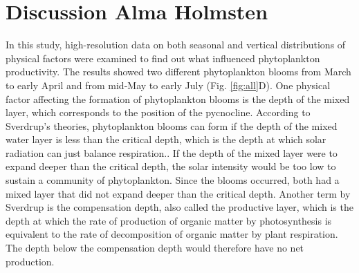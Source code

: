 \documentclass[../Main.tex]{subfiles}
\begin{document}
\section*{\crule[blue]{.3cm}{.3cm} Discussion \scriptsize{Alma Holmsten}}
In this study, high-resolution data on both seasonal and vertical distributions of physical factors were examined to find out what influenced phytoplankton productivity. The results showed two different phytoplankton blooms from March to early April and from mid-May to early July (Fig. \ref{fig:all}D). One physical factor affecting the formation of phytoplankton blooms is the depth of the mixed layer, which corresponds to the position of the pycnocline.  
According to Sverdrup's theories, phytoplankton blooms can form if the depth of the mixed water layer is less than the critical depth, which is the depth at which solar radiation can just balance respiration.\supercite{Sverdrup1953OnCF}. If the depth of the mixed layer were to expand deeper than the critical depth, the solar intensity would be too low to sustain a community of phytoplankton. Since the blooms occurred, both had a mixed layer that did not expand deeper than the critical depth. Another term by Sverdrup is the compensation depth, also called the productive layer, which is the depth at which the rate of production of organic matter by photosynthesis is equivalent to the rate of decomposition of organic matter by plant respiration\supercite{Sverdrup1953OnCF}. 
The depth below the compensation depth would therefore have no net production. 
\end{document}

